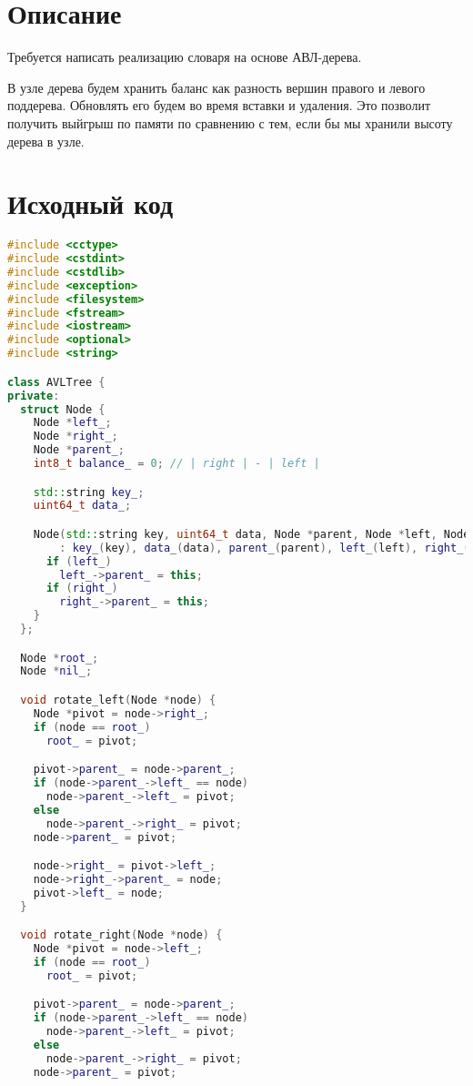 \section{Описание}
Требуется написать реализацию словаря на основе АВЛ-дерева.

В узле дерева будем хранить баланс как разность вершин правого и левого поддерева. Обновлять его будем во время вставки и удаления. Это позволит получить выйгрыш по памяти по сравнению с тем, если бы мы хранили высоту дерева в узле.


\pagebreak

\section{Исходный код}

\begin{lstlisting}[language=C++]
#include <cctype>
#include <cstdint>
#include <cstdlib>
#include <exception>
#include <filesystem>
#include <fstream>
#include <iostream>
#include <optional>
#include <string>

class AVLTree {
private:
  struct Node {
    Node *left_;
    Node *right_;
    Node *parent_;
    int8_t balance_ = 0; // | right | - | left |

    std::string key_;
    uint64_t data_;

    Node(std::string key, uint64_t data, Node *parent, Node *left, Node *right)
        : key_(key), data_(data), parent_(parent), left_(left), right_(right) {
      if (left_)
        left_->parent_ = this;
      if (right_)
        right_->parent_ = this;
    }
  };

  Node *root_;
  Node *nil_;

  void rotate_left(Node *node) {
    Node *pivot = node->right_;
    if (node == root_)
      root_ = pivot;

    pivot->parent_ = node->parent_;
    if (node->parent_->left_ == node)
      node->parent_->left_ = pivot;
    else
      node->parent_->right_ = pivot;
    node->parent_ = pivot;

    node->right_ = pivot->left_;
    node->right_->parent_ = node;
    pivot->left_ = node;
  }

  void rotate_right(Node *node) {
    Node *pivot = node->left_;
    if (node == root_)
      root_ = pivot;

    pivot->parent_ = node->parent_;
    if (node->parent_->left_ == node)
      node->parent_->left_ = pivot;
    else
      node->parent_->right_ = pivot;
    node->parent_ = pivot;


\end{lstlisting}
